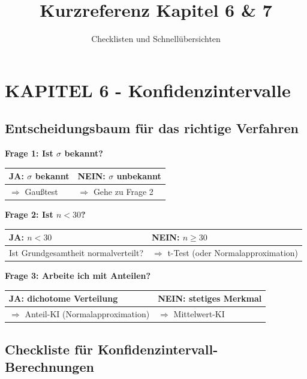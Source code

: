 \documentclass[10pt, a4paper, ngerman]{scrartcl}
\title{Kurzreferenz Kapitel 6 \& 7}
\subtitle{Checklisten und Schnellübersichten}
\author{}
\date{}
\begin{document}
\maketitle

\section{KAPITEL 6 - Konfidenzintervalle}

\subsection{Entscheidungsbaum für das richtige Verfahren}

\vspace{0.5cm}

\textbf{Frage 1: Ist $\sigma$ bekannt?}

\begin{tabular}{|p{8cm}|p{8cm}|}
  \hline
  \textbf{JA: $\sigma$ bekannt} & \textbf{NEIN: $\sigma$ unbekannt} \\
  \hline
  $\Rightarrow$ Gaußtest & $\Rightarrow$ Gehe zu Frage 2 \\
  \hline
\end{tabular}

\textbf{Frage 2: Ist $n < 30$?}

\begin{tabular}{|p{8cm}|p{8cm}|}
  \hline
  \textbf{JA: $n < 30$} & \textbf{NEIN: $n \geq 30$} \\
  \hline
  Ist Grundgesamtheit normalverteilt? & $\Rightarrow$ t-Test (oder Normalapproximation) \\
  \hline
\end{tabular}

\textbf{Frage 3: Arbeite ich mit Anteilen?}

\begin{tabular}{|p{8cm}|p{8cm}|}
  \hline
  \textbf{JA: dichotome Verteilung} & \textbf{NEIN: stetiges Merkmal} \\
  \hline
  $\Rightarrow$ Anteil-KI (Normalapproximation) & $\Rightarrow$ Mittelwert-KI \\
  \hline
\end{tabular}

\subsection{Checkliste für Konfidenzintervall-Berechnungen}
\end{document}
